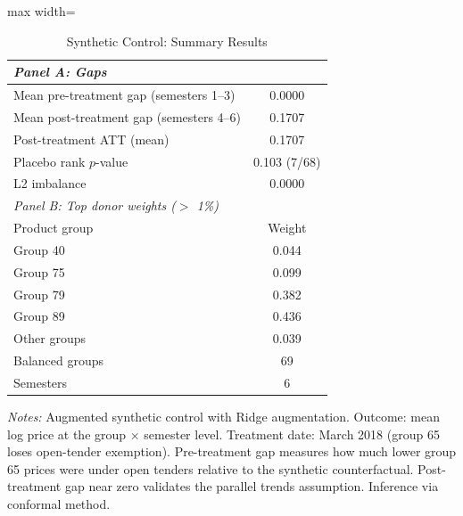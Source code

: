 \begin{table}[htbp]
\centering
\caption{Synthetic Control: Summary Results}
\label{tab:synth}
\begin{adjustbox}{max width=\textwidth}
\begin{threeparttable}
\small
\begin{tabular}{lc}
\toprule
\multicolumn{2}{l}{\textit{Panel A: Gaps}} \\
\midrule
Mean pre-treatment gap (semesters 1--3) & 0.0000 \\
Mean post-treatment gap (semesters 4--6) & 0.1707 \\
Post-treatment ATT (mean) & 0.1707 \\
Placebo rank $p$-value & 0.103 (7/68) \\
L2 imbalance & 0.0000 \\
\midrule
\multicolumn{2}{l}{\textit{Panel B: Top donor weights ($>$ 1\%)}} \\
\midrule
Product group & Weight \\
Group 40 & 0.044 \\
Group 75 & 0.099 \\
Group 79 & 0.382 \\
Group 89 & 0.436 \\
Other groups & 0.039 \\
\midrule
Balanced groups & 69 \\
Semesters & 6 \\
\bottomrule
\end{tabular}
\begin{tablenotes}
\small
\item \textit{Notes:} Augmented synthetic control with Ridge augmentation.
Outcome: mean log price at the group $\times$ semester level.
Treatment date: March 2018 (group 65 loses open-tender exemption).
Pre-treatment gap measures how much lower group 65 prices were under
open tenders relative to the synthetic counterfactual.
Post-treatment gap near zero validates the parallel trends assumption.
Inference via conformal method.
\end{tablenotes}
\end{threeparttable}
\end{adjustbox}
\end{table}
